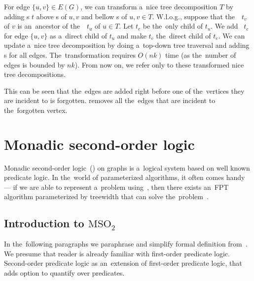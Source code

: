 For edge \( \{u, v\} \in E(G) \), we can transform a~nice tree decomposition \( T \)
by adding \IntroduceEdgeNode{}s \( t \) above \IntroduceVertexNode{}s of \( u, v \)
and bellow \ForgetVertexNode{}s of \( u, v \in T \).
%
W.l.o.g., suppose that the~\ForgetVertexNode{}~\( t_v \) of \( v \) is
an~ancestor of the~\ForgetVertexNode{}~\( t_u \) of \( u \in T \).
Let \( t_c \) be the~only child of \( t_u \).
%
We add \IntroduceEdgeNode{}~\( t_e \) for edge \( \{u, v\} \)
as a~direct child of \( t_u \) and make \( t_c \) the~direct child of \( t_e \).
%
We can update a~nice tree decomposition by doing
a~top-down tree traversal and adding \IntroduceEdgeNode{}s for all edges.
The~transformation requires \( O(nk) \) time (as the~number of edges is bounded by \( nk \)).
From now on, we refer only to these transformed nice tree decompositions.

%
%
This can be seen that the~edges are added right before one of the~vertices
they are incident to is forgotten. \ForgetVertexNode{} removes all the~edges
that are incident to the~forgotten vertex.


\section{Monadic second-order logic}

Monadic second-order logic~(\MSO{}) on graphs is a~logical system based on
well known predicate logic.
In the~world of parameterized algorithms,
it often comes handy --- if we are able to represent a~problem using~\MSO{},
then there exists an~FPT algorithm parameterized by treewidth
that can solve the~problem~\cite{tree_width_mso}.

\subsection{Introduction to \( \text{MSO}_2 \)}

In the~following paragraphs we paraphrase and simplify formal definition
from~\cite{book_parametrized_algorithms}.
We presume that reader is already familiar with first-order predicate logic.
Second-order predicate logic as an~extension of first-order predicate logic,
that adds option to quantify over predicates.

